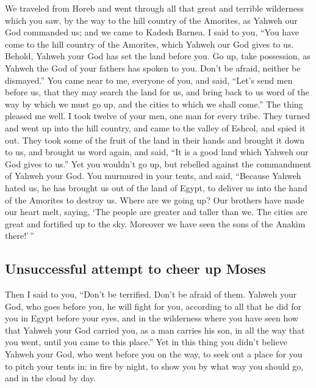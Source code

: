  We traveled from Horeb and went through all that great
and terrible wilderness which you saw, by the way to the hill country of
the Amorites, as Yahweh our God commanded us; and we came to Kadesh
Barnea.  I said to you, ``You have come to the hill
country of the Amorites, which Yahweh our God gives to us.
 Behold, Yahweh your God has set the land before you. Go
up, take possession, as Yahweh the God of your fathers has spoken to
you. Don't be afraid, neither be dismayed.''  You came
near to me, everyone of you, and said, ``Let's send men before us, that
they may search the land for us, and bring back to us word of the way by
which we must go up, and the cities to which we shall come.''
 The thing pleased me well. I took twelve of your men,
one man for every tribe.  They turned and went up into
the hill country, and came to the valley of Eshcol, and spied it out.
 They took some of the fruit of the land in their hands
and brought it down to us, and brought us word again, and said, ``It is
a good land which Yahweh our God gives to us.''  Yet you
wouldn't go up, but rebelled against the commandment of Yahweh your God.
 You murmured in your tents, and said, ``Because Yahweh
hated us, he has brought us out of the land of Egypt, to deliver us into
the hand of the Amorites to destroy us.  Where are we
going up? Our brothers have made our heart melt, saying, `The people are
greater and taller than we. The cities are great and fortified up to the
sky. Moreover we have seen the sons of the Anakim there!'\,''

\hypertarget{unsuccessful-attempt-to-cheer-up-moses}{%
\subsection{Unsuccessful attempt to cheer up
Moses}\label{unsuccessful-attempt-to-cheer-up-moses}}

 Then I said to you, ``Don't be terrified. Don't be
afraid of them.  Yahweh your God, who goes before you, he
will fight for you, according to all that he did for you in Egypt before
your eyes,  and in the wilderness where you have seen how
that Yahweh your God carried you, as a man carries his son, in all the
way that you went, until you came to this place.''  Yet
in this thing you didn't believe Yahweh your God,  who
went before you on the way, to seek out a place for you to pitch your
tents in: in fire by night, to show you by what way you should go, and
in the cloud by day.

